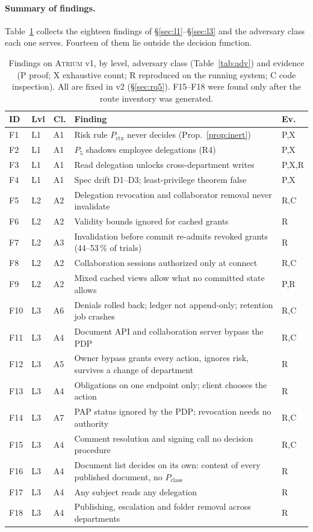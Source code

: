 \documentclass[sigconf,review,anonymous]{acmart}
\newcommand{\sysname}{\textsc{Atrium}\xspace}
\newcommand{\sysname}{\textsc{OpenZTAC}\xspace}
\newcommand{\Pc}{P_{\mathrm{class}}}
\newcommand{\Px}{P_{\mathrm{ctx}}}
\begin{document}
\paragraph{Summary of findings.} Table~\ref{tab:findings} collects the eighteen findings of
\S\ref{sec:l1}--\S\ref{sec:l3} and the adversary class each one serves. Fourteen of them lie outside the decision
function.

\begin{table}[t]
\caption{Findings on \sysname v1, by level, adversary class (Table~\ref{tab:adv}) and evidence (P proof; X
exhaustive count; R reproduced on the running system; C code inspection). All are fixed in v2
(\S\ref{sec:rq5}). F15--F18 were found only after the route inventory was generated.}
\label{tab:findings}
\small
\begin{tabularx}{\columnwidth}{@{}l@{\;}l@{\;}l@{\;}X@{\;}l@{}}
\toprule
ID & Lvl & Cl. & Finding & Ev. \\
\midrule
F1 & L1 & A1 & Risk rule $\Px$ never decides (Prop.~\ref{prop:inert}) & P,X \\
F2 & L1 & A1 & $P_5$ shadows employee delegations (R4) & P,X \\
F3 & L1 & A1 & Read delegation unlocks cross-department writes & P,X,R \\
F4 & L1 & A1 & Spec drift D1--D3; least-privilege theorem false & P,X \\
F5 & L2 & A2 & Delegation revocation and collaborator removal never invalidate & R,C \\
F6 & L2 & A2 & Validity bounds ignored for cached grants & R \\
F7 & L2 & A3 & Invalidation before commit re-admits revoked grants (44--53\,\% of trials) & R \\
F8 & L2 & A2 & Collaboration sessions authorized only at connect & R,C \\
F9 & L2 & A2 & Mixed cached views allow what no committed state allows & P,R \\
F10 & L3 & A6 & Denials rolled back; ledger not append-only; retention job crashes & R,C \\
F11 & L3 & A4 & Document API and collaboration server bypass the PDP & R,C \\
F12 & L3 & A5 & Owner bypass grants every action, ignores risk, survives a change of department & R \\
F13 & L3 & A4 & Obligations on one endpoint only; client chooses the action & R \\
F14 & L3 & A7 & PAP status ignored by the PDP; revocation needs no authority & R,C \\
F15 & L3 & A4 & Comment resolution and signing call no decision procedure & R,C \\
F16 & L3 & A4 & Document list decides on its own: content of every published document, no $\Pc$ & R \\
F17 & L3 & A4 & Any subject reads any delegation & R \\
F18 & L3 & A4 & Publishing, escalation and folder removal across departments & R \\
\bottomrule
\end{tabularx}
\end{table}
\end{document}
